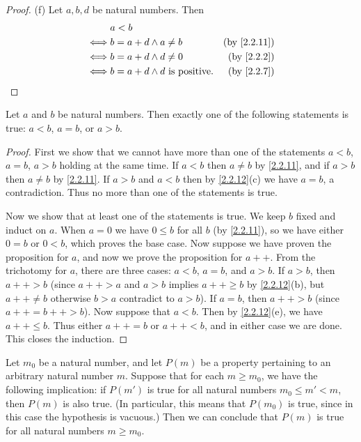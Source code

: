 \begin{proof}{(f)}
  Let \(a, b, d\) be natural numbers.
  Then
  \begin{align*}
         & a < b                                                              \\
    \iff & b = a + d \land a \neq b               & \text{(by \cref{2.2.11})} \\
    \iff & b = a + d \land d \neq 0               & \text{(by \cref{2.2.2})}  \\
    \iff & b = a + d \land d \text{ is positive}. & \text{(by \cref{2.2.7})}
  \end{align*}
\end{proof}

\begin{proposition}\label{2.2.13}
  Let \(a\) and \(b\) be natural numbers.
  Then exactly one of the following statements is true: \(a < b\), \(a = b\), or \(a > b\).
\end{proposition}

\begin{proof}
  First we show that we cannot have more than one of the statements \(a < b\), \(a = b\), \(a > b\) holding at the same time.
  If \(a < b\) then \(a \neq b\) by \cref{2.2.11}, and if \(a > b\) then \(a \neq b\) by \cref{2.2.11}.
  If \(a > b\) and \(a < b\) then by \cref{2.2.12}(c) we have \(a = b\), a contradiction.
  Thus no more than one of the statements is true.

  Now we show that at least one of the statements is true.
  We keep \(b\) fixed and induct on \(a\).
  When \(a = 0\) we have \(0 \leq b\) for all \(b\) (by \cref{2.2.11}), so we have either \(0 = b\) or \(0 < b\), which proves the base case.
  Now suppose we have proven the proposition for \(a\), and now we prove the proposition for \(a++\).
  From the trichotomy for \(a\), there are three cases: \(a < b\), \(a = b\), and \(a > b\).
  If \(a > b\), then \(a++ > b\) (since \(a++ > a\) and \(a > b\) implies \(a++ \geq b\) by \cref{2.2.12}(b), but \(a++ \neq b\) otherwise \(b > a\) contradict to \(a > b\)).
  If \(a = b\), then \(a++ > b\) (since \(a++ = b++ > b\)).
  Now suppose that \(a < b\).
  Then by \cref{2.2.12}(e), we have \(a++ \leq b\).
  Thus either \(a++ = b\) or \(a++ < b\), and in either case we are done.
  This closes the induction.
\end{proof}

\begin{proposition}\label{2.2.14}
  Let \(m_0\) be a natural number, and let \(P(m)\) be a property pertaining to an arbitrary natural number \(m\).
  Suppose that for each \(m \geq m_0\), we have the following implication: if \(P(m')\) is true for all natural numbers \(m_0 \leq m' < m\), then \(P(m)\) is also true.
  (In particular, this means that \(P(m_0)\) is true, since in this case the hypothesis is vacuous.)
  Then we can conclude that \(P(m)\) is true for all natural numbers \(m \geq m_0\).
\end{proposition}

